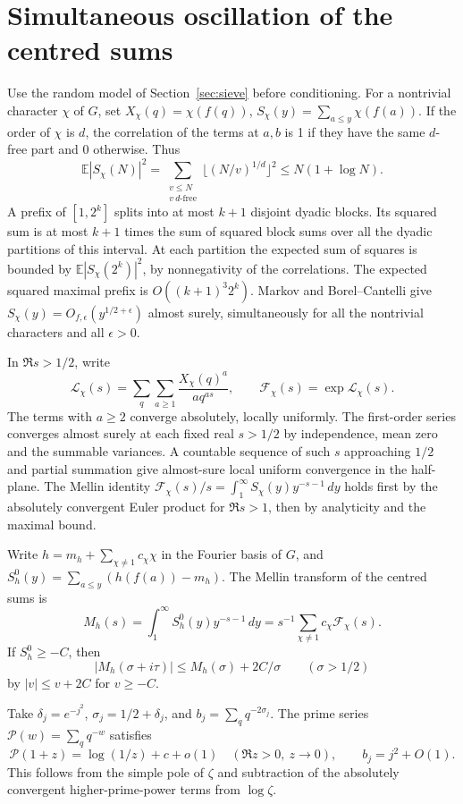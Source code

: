 \documentclass[11pt,reqno]{amsart}
\newcommand{\EE}{\mathbb E}
\begin{document}
\section{Simultaneous oscillation of the centred sums}\label{app:random}
Use the random model of Section~\ref{sec:sieve} before conditioning. For a nontrivial character \(\chi\) of \(G\), set \(X_\chi(q)=\chi(f(q))\),
\(S_\chi(y)=\sum_{a\le y}\chi(f(a))\). If the order of \(\chi\) is \(d\), the correlation of the terms at \(a,b\) is 1 if they have the same \(d\)-free part and 0 otherwise. Thus
\[
 \EE |S_\chi(N)|^2 =
 \sum_{\substack{v\le N\\v\ d\text{-free}}}
       \lfloor(N/v)^{1/d}\rfloor^2\le N(1+\log N).
\]
A prefix of \([1,2^k]\) splits into at most \(k+1\) disjoint dyadic blocks. Its squared sum is at most \(k+1\) times the sum of squared block sums over all the dyadic partitions of this interval. At each partition the expected sum of squares is bounded by \(\EE|S_\chi(2^k)|^2\), by nonnegativity of the correlations. The expected squared maximal prefix is \(O((k+1)^3 2^k)\). Markov and Borel--Cantelli give \(S_\chi(y)=O_{f,\epsilon}(y^{1/2+\epsilon})\) almost surely, simultaneously for all the nontrivial characters and all \(\epsilon>0\).

In \(\Re s>1/2\), write
\[
 \mathcal L_\chi(s)=\sum_q\sum_{a\ge1}\frac{X_\chi(q)^a}{a q^{as}},
 \qquad \mathcal F_\chi(s)=\exp\mathcal L_\chi(s).
\]
The terms with \(a\ge2\) converge absolutely, locally uniformly. The first-order series converges almost surely at each fixed real \(s>1/2\) by independence, mean zero and the summable variances. A countable sequence of such \(s\) approaching \(1/2\) and partial summation give almost-sure local uniform convergence in the half-plane. The Mellin identity \(\mathcal F_\chi(s)/s=\int_1^\infty S_\chi(y)y^{-s-1}\,dy\) holds first by the absolutely convergent Euler product for \(\Re s>1\), then by analyticity and the maximal bound.

Write \(h=m_h+\sum_{\chi\ne1}c_\chi\chi\) in the Fourier basis of \(G\), and \(S_h^0(y)=\sum_{a\le y}(h(f(a))-m_h)\). The Mellin transform of the centred sums is
\[
 M_h(s)=\int_1^\infty S_h^0(y)y^{-s-1}\,dy
       =s^{-1}\sum_{\chi\ne1}c_\chi\mathcal F_\chi(s).
\]
If \(S_h^0\ge-C\), then
\begin{equation}\label{eq:mellin-bound}
 |M_h(\sigma+i\tau)|\le M_h(\sigma)+2C/\sigma
 \qquad(\sigma>1/2)
\end{equation}
by \(|v|\le v+2C\) for \(v\ge-C\).

Take \(\delta_j=e^{-j^2}\), \(\sigma_j=1/2+\delta_j\), and \(b_j=\sum_q q^{-2\sigma_j}\). The prime series \(\mathcal P(w)=\sum_q q^{-w}\) satisfies
\begin{equation}\label{eq:prime-sum}
 \mathcal P(1+z)=\log(1/z)+c+o(1)\quad(\Re z>0,\ z\to0),
 \qquad b_j=j^2+O(1).
\end{equation}
This follows from the simple pole of \(\zeta\) and subtraction of the absolutely convergent higher-prime-power terms from \(\log\zeta\).
\end{document}
